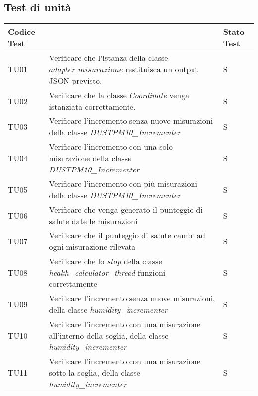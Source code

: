 \subsection{Test di unità}

\begin{longtable}{|C{1.9cm}|L{5.5cm}|C{2cm}|}
    \hline
    \textbf{Codice Test} &  & \textbf{Stato Test} \\
    \hline \hline
    
    TU01 & Verificare che l'istanza della classe $\textit{adapter\_misurazione}$ restituisca un output JSON previsto.  & S \\
    \hline

    TU02 & Verificare che la classe \textit{Coordinate} venga istanziata correttamente.  & S \\
    \hline

    TU03 & Verificare l'incremento senza nuove misurazioni della classe \textit{DUSTPM10\_Incrementer} & S \\
    \hline

    TU04 & Verificare l'incremento con una solo misurazione della classe \textit{DUSTPM10\_Incrementer} & S \\
    \hline

    TU05 & Verificare l'incremento con più misurazioni della classe  \textit{DUSTPM10\_Incrementer} & S \\
    \hline

    TU06 & Verificare che venga generato il punteggio di salute date le misurazioni & S \\
    \hline

    TU07 & Verificare che il punteggio di salute cambi ad ogni misurazione rilevata & S \\
    \hline

    TU08 & Verificare che lo \textit{stop} della classe \textit{health\_calculator\_thread} funzioni correttamente & S \\
    \hline

    TU09 & Verificare l'incremento senza nuove misurazioni, della classe \textit{humidity\_incrementer} & S \\
    \hline

    TU10 & Verificare l'incremento con una misurazione all'interno della soglia, della classe \textit{humidity\_incrementer} & S \\
    \hline

    TU11 & Verificare l'incremento con una misurazione sotto la soglia,  della classe \textit{humidity\_incrementer} & S \\
    \hline


\end{longtable}
